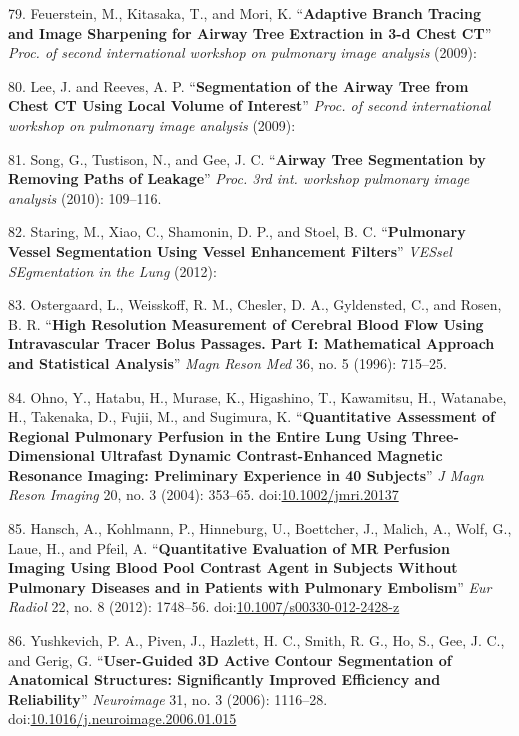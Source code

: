 \documentclass[11pt,]{article}
\begin{document}
\hypertarget{ref-Feuerstein:2009aa}{}
79. Feuerstein, M., Kitasaka, T., and Mori, K. ``\textbf{Adaptive Branch
Tracing and Image Sharpening for Airway Tree Extraction in 3-d Chest
CT}'' \emph{Proc. of second international workshop on pulmonary image
analysis} (2009):

\hypertarget{ref-Lee:2009aa}{}
80. Lee, J. and Reeves, A. P. ``\textbf{Segmentation of the Airway Tree
from Chest CT Using Local Volume of Interest}'' \emph{Proc. of second
international workshop on pulmonary image analysis} (2009):

\hypertarget{ref-Song:2010aa}{}
81. Song, G., Tustison, N., and Gee, J. C. ``\textbf{Airway Tree
Segmentation by Removing Paths of Leakage}'' \emph{Proc. 3rd int.
workshop pulmonary image analysis} (2010): 109--116.

\hypertarget{ref-Staring:2012aa}{}
82. Staring, M., Xiao, C., Shamonin, D. P., and Stoel, B. C.
``\textbf{Pulmonary Vessel Segmentation Using Vessel Enhancement
Filters}'' \emph{VESsel SEgmentation in the Lung} (2012):

\hypertarget{ref-Ostergaard:1996aa}{}
83. Ostergaard, L., Weisskoff, R. M., Chesler, D. A., Gyldensted, C.,
and Rosen, B. R. ``\textbf{High Resolution Measurement of Cerebral Blood
Flow Using Intravascular Tracer Bolus Passages. Part I: Mathematical
Approach and Statistical Analysis}'' \emph{Magn Reson Med} 36, no. 5
(1996): 715--25.

\hypertarget{ref-Ohno:2004aa}{}
84. Ohno, Y., Hatabu, H., Murase, K., Higashino, T., Kawamitsu, H.,
Watanabe, H., Takenaka, D., Fujii, M., and Sugimura, K.
``\textbf{Quantitative Assessment of Regional Pulmonary Perfusion in the
Entire Lung Using Three-Dimensional Ultrafast Dynamic Contrast-Enhanced
Magnetic Resonance Imaging: Preliminary Experience in 40 Subjects}''
\emph{J Magn Reson Imaging} 20, no. 3 (2004): 353--65.
doi:\href{https://doi.org/10.1002/jmri.20137}{10.1002/jmri.20137}

\hypertarget{ref-Hansch:2012aa}{}
85. Hansch, A., Kohlmann, P., Hinneburg, U., Boettcher, J., Malich, A.,
Wolf, G., Laue, H., and Pfeil, A. ``\textbf{Quantitative Evaluation of
MR Perfusion Imaging Using Blood Pool Contrast Agent in Subjects Without
Pulmonary Diseases and in Patients with Pulmonary Embolism}'' \emph{Eur
Radiol} 22, no. 8 (2012): 1748--56.
doi:\href{https://doi.org/10.1007/s00330-012-2428-z}{10.1007/s00330-012-2428-z}

\hypertarget{ref-Yushkevich:2006aa}{}
86. Yushkevich, P. A., Piven, J., Hazlett, H. C., Smith, R. G., Ho, S.,
Gee, J. C., and Gerig, G. ``\textbf{User-Guided 3D Active Contour
Segmentation of Anatomical Structures: Significantly Improved Efficiency
and Reliability}'' \emph{Neuroimage} 31, no. 3 (2006): 1116--28.
doi:\href{https://doi.org/10.1016/j.neuroimage.2006.01.015}{10.1016/j.neuroimage.2006.01.015}
\end{document}
